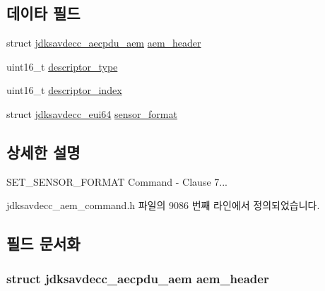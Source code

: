 \subsection*{데이타 필드}
\begin{DoxyCompactItemize}
\item 
struct \hyperlink{structjdksavdecc__aecpdu__aem}{jdksavdecc\+\_\+aecpdu\+\_\+aem} \hyperlink{structjdksavdecc__aem__command__set__sensor__format_ae1e77ccb75ff5021ad923221eab38294}{aem\+\_\+header}
\item 
uint16\+\_\+t \hyperlink{structjdksavdecc__aem__command__set__sensor__format_ab7c32b6c7131c13d4ea3b7ee2f09b78d}{descriptor\+\_\+type}
\item 
uint16\+\_\+t \hyperlink{structjdksavdecc__aem__command__set__sensor__format_a042bbc76d835b82d27c1932431ee38d4}{descriptor\+\_\+index}
\item 
struct \hyperlink{structjdksavdecc__eui64}{jdksavdecc\+\_\+eui64} \hyperlink{structjdksavdecc__aem__command__set__sensor__format_a100aa7be90c95e113ca53584ab78094a}{sensor\+\_\+format}
\end{DoxyCompactItemize}


\subsection{상세한 설명}
S\+E\+T\+\_\+\+S\+E\+N\+S\+O\+R\+\_\+\+F\+O\+R\+M\+AT Command -\/ Clause 7... 

jdksavdecc\+\_\+aem\+\_\+command.\+h 파일의 9086 번째 라인에서 정의되었습니다.



\subsection{필드 문서화}
\subsubsection[{\texorpdfstring{aem\+\_\+header}{aem_header}}]{\setlength{\rightskip}{0pt plus 5cm}struct {\bf jdksavdecc\+\_\+aecpdu\+\_\+aem} aem\+\_\+header}\hypertarget{structjdksavdecc__aem__command__set__sensor__format_ae1e77ccb75ff5021ad923221eab38294}{}\label{structjdksavdecc__aem__command__set__sensor__format_ae1e77ccb75ff5021ad923221eab38294}



